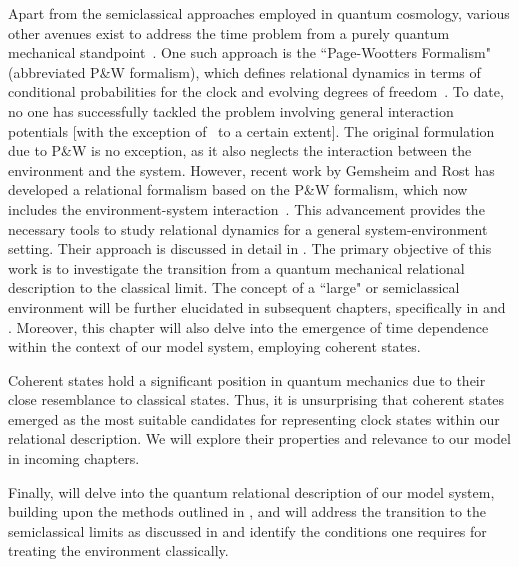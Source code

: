 Apart from the semiclassical approaches employed in quantum cosmology, various other avenues 
exist to address the time problem from a purely quantum mechanical standpoint~\cite{hohn2021trinity}. 
One such approach is the ``Page-Wootters Formalism" (abbreviated P\&W formalism), which defines 
relational dynamics in terms of conditional probabilities for the clock and evolving degrees of 
freedom~\cite{page1983evolution}. To date, no one has successfully tackled the problem involving 
general interaction potentials [with the exception of~\cite{Smith:2017pwx} to a certain extent]. 
The original formulation due to P\&W is no exception, as it also neglects the interaction between 
the environment and the system. However, recent work by Gemsheim and Rost has developed a relational 
formalism based on the P\&W formalism, which now includes the environment-system 
interaction~\cite{Gemsheim:2023izg}. This advancement provides the necessary tools to study 
relational dynamics for a general system-environment setting. Their approach is discussed in 
detail in . The primary objective of this work is to investigate the transition from a quantum mechanical 
relational description to the classical limit. The concept of a ``large" or semiclassical 
environment will be further elucidated in subsequent chapters, specifically in 
 and . 
Moreover, this chapter will also delve into the emergence of time dependence within the context of our model system, employing coherent states.

Coherent states hold a significant position in quantum mechanics due to their close 
resemblance to classical states. Thus, it is unsurprising that coherent states 
emerged as the most suitable candidates for representing clock states within our 
relational description. We will explore their properties and relevance 
to our model in incoming chapters.

Finally,  will delve into the quantum relational 
description of our model system, building upon the methods outlined in 
, and will address the transition to the semiclassical 
limits as discussed in  and identify the conditions one requires for treating the environment classically.

\newpage